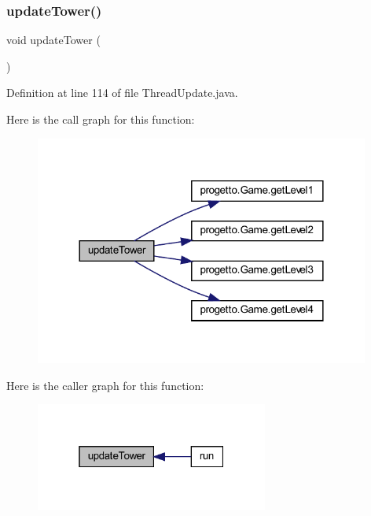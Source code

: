 \subsubsection{\texorpdfstring{update\+Tower()}{updateTower()}}
{\footnotesize\ttfamily void update\+Tower (\begin{DoxyParamCaption}{ }\end{DoxyParamCaption})\hspace{0.3cm}{\ttfamily [private]}}



Definition at line 114 of file Thread\+Update.\+java.

Here is the call graph for this function\+:\nopagebreak
\begin{figure}[H]
\begin{center}
\leavevmode
\includegraphics[width=312pt]{classprogetto_1_1_thread_update_ae4fd4a959e4d782a5e7ac0eff77ba27f_cgraph}
\end{center}
\end{figure}
Here is the caller graph for this function\+:\nopagebreak
\begin{figure}[H]
\begin{center}
\leavevmode
\includegraphics[width=217pt]{classprogetto_1_1_thread_update_ae4fd4a959e4d782a5e7ac0eff77ba27f_icgraph}
\end{center}
\end{figure}
\mbox{\label{classprogetto_1_1_thread_update_ab424ab29e7ab4733f2efd1e6ef3f13b1}} 
